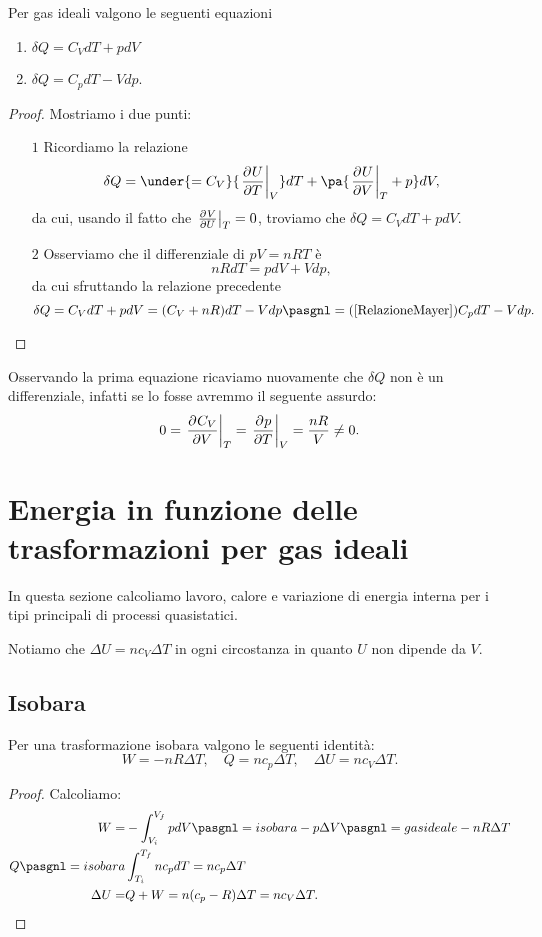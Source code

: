 \begin{proposition}\label{CaloreInfinitesimaleConCapacita}
Per gas ideali valgono le seguenti equazioni
\begin{enumerate}
\item $\delta Q=C_VdT+pdV$
\item $\delta Q=C_p dT-Vdp$.
\end{enumerate}
\end{proposition}
\begin{proof}
Mostriamo i due punti:
\setlength{\leftmargini}{0cm}
\begin{itemize}
\item[$\boxed{1}$] Ricordiamo la relazione \[\delta Q=\under{=C_V}{\ppb TUV} dT+\pa{{\ppb VUT}+p}dV,\]
da cui, usando il fatto che $\ppb UVT=0$, troviamo che $\delta Q=C_V dT+pdV$.
\item[$\boxed{2}$] Osserviamo che il differenziale di $pV=nRT$ \`e
\[nRdT=pdV+Vdp,\]
da cui sfruttando la relazione precedente
\[\delta Q=C_VdT+pdV=({C_V+nR})dT-Vdp\pasgnl={(\ref{RelazioneMayer})}C_p dT-Vdp.\]
\end{itemize}
\setlength{\leftmargini}{0.5cm}
\end{proof}
\begin{remark}
Osservando la prima equazione ricaviamo nuovamente che $\delta Q$ non \`e un differenziale, infatti se lo fosse avremmo il seguente assurdo:
\[0=\ppb V{C_V}T=\ppb TpV=\frac{nR}V\neq 0.\]
\end{remark}




\section{Energia in funzione delle trasformazioni per gas ideali}

\noindent In questa sezione calcoliamo lavoro, calore e variazione di energia interna per i tipi principali di processi quasistatici.\medskip

\noindent Notiamo che $\Delta U=nc_V\Delta T$ in ogni circostanza in quanto $U$ non dipende da $V$.
\subsection{Isobara}
\begin{proposition}\label{EnergieIsobara}
Per una trasformazione isobara valgono le seguenti identit\`a:
\[W=-nR\Delta T,\quad
Q=nc_p\Delta T,\quad
\Delta U=nc_V\Delta T.\]
\end{proposition}
\begin{proof}
Calcoliamo:
\begin{align*}
W=&-\int_{V_i}^{V_f}pdV\pasgnl={isobara}-p\Delta V\pasgnl={gas ideale}-nR\Delta T\\
Q\pasgnl={isobara}&\int_{T_i}^{T_f}nc_pdT=nc_p\Delta T\\
\Delta U=&Q+W=n(c_p-R)\Delta T=nc_V\Delta T.
\end{align*}
\end{proof}

